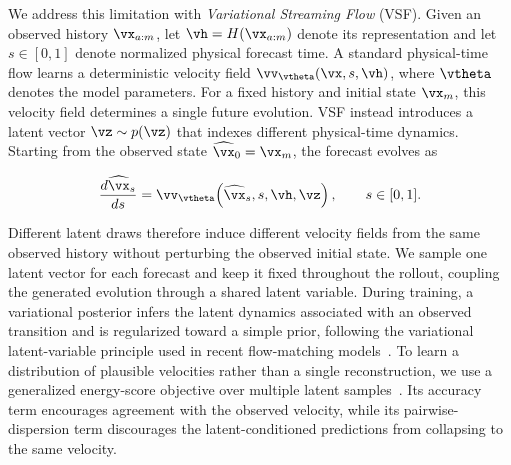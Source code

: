 We address this limitation with \emph{Variational Streaming Flow} (VSF).
Given an observed history $\vx_{a:m}$, let $\vh=H(\vx_{a:m})$ denote its
representation and let $s\in[0,1]$ denote normalized physical forecast time.
A standard physical-time flow learns a deterministic velocity field
$\vv_{\vtheta}(\vx,s,\vh)$, where $\vtheta$ denotes the model parameters.
For a fixed history and initial state $\vx_m$, this velocity field determines a
single future evolution. VSF instead introduces a latent vector $\vz\sim p(\vz)$ that indexes different
physical-time dynamics. Starting from the observed state $\widehat{\vx}_0=\vx_m$,
the forecast evolves as
%
\begin{tcolorbox}[
  colback=parchment,
  colframe=sandborder,
  boxrule=0.3pt,
  left=8pt,
  right=8pt,
  top=3pt,
  bottom=3pt
]
\begin{equation}
\frac{d\widehat{\vx}_s}{ds}
=
\vv_{\vtheta}\!\left(
    \widehat{\vx}_s,s,\vh,\vz
\right),
\qquad s\in[0,1].
\label{eq:intro_vsf}
\end{equation}
\end{tcolorbox}
%
%
Different latent draws therefore induce different velocity fields from the same
observed history without perturbing the observed initial state. We sample one
latent vector for each forecast and keep it fixed throughout the rollout,
coupling the generated evolution through a shared latent variable. During
training, a variational posterior infers the latent dynamics associated with an
observed transition and is regularized toward a simple prior, following the
variational latent-variable principle used in recent flow-matching
models~\citep{guo2025variational,eijkelboom2024variational}. To learn a
distribution of plausible velocities rather than a single reconstruction, we
use a generalized energy-score objective over multiple latent
samples~\citep{gneiting2007strictly,bouchacourt2016disco}. Its accuracy term
encourages agreement with the observed velocity, while its pairwise-dispersion
term discourages the latent-conditioned predictions from collapsing to the
same velocity.

